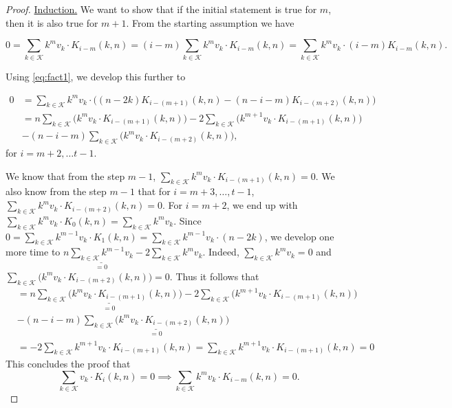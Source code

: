 \begin{proof}
    \underline{Induction.} We want to show that if the initial statement is true for $m$, then it is also true for $m+1$. From the starting assumption we have

    $$
    0 = \sum_{k \in \mathcal{K}} k^mv_k \cdot K_{i-m}(k, n) = (i-m)\sum_{k \in \mathcal{K}} k^mv_k \cdot K_{i-m}(k, n) = \sum_{k \in \mathcal{K}} k^mv_k \cdot (i-m)K_{i-m}(k, n).
    $$

    Using \cref{eq:fact1}, we develop this further to

    \begin{equation*}
    \begin{split}
        0 &= \sum_{k \in \mathcal{K}} k^mv_k \cdot \Big( (n - 2k)K_{i - (m+1)}(k, n) - (n - i - m)K_{i - (m + 2)}(k, n) \Big)\\
        & = n \sum_{k \in \mathcal{K}} \Big( k^mv_k \cdot K_{i - (m+1)}(k, n) \Big) - 2\sum_{k \in \mathcal{K}} \Big( k^{m+1}v_k \cdot K_{i - (m+1)}(k, n) \Big)\\& - (n - i - m)\sum_{k \in \mathcal{K}} \Big( k^mv_k \cdot K_{i - (m+2)}(k, n) \Big),
    \end{split}
    \end{equation*}
    for $i = m+2, \ldots t-1$.

    We know that from the step $m-1$, $\sum_{k \in \mathcal{K}} k^mv_k \cdot K_{i - (m+1)}(k, n) = 0$. We also know from the step $m-1$ that for $i = m+3, \ldots, t-1$, $\sum_{k \in \mathcal{K}} k^mv_k \cdot K_{i - (m+2)}(k, n) = 0$. For $i = m + 2$, we end up with $\sum_{k \in \mathcal{K}} k^mv_k \cdot K_0(k, n) = \sum_{k \in \mathcal{K}} k^mv_k$. Since $0 = \sum_{k \in \mathcal{K}} k^{m-1}v_k \cdot K_1(k, n) = \sum_{k \in \mathcal{K}} k^{m-1}v_k \cdot (n - 2k)$, we develop one more time to $n\underset{=0}{\underline{\sum_{k \in \mathcal{K}} k^{m-1}v_k}} - 2\sum_{k \in \mathcal{K}}k^mv_k$. Indeed, $\sum_{k \in \mathcal{K}}k^mv_k = 0$ and $\sum_{k \in \mathcal{K}} \Big( k^mv_k \cdot K_{i - (m+2)}(k, n) \Big) = 0$. Thus it follows that
    \begin{equation*}
    \begin{split}
        & = n \underset{=0}{\underline{\sum_{k \in \mathcal{K}} \Big( k^mv_k \cdot K_{i - (m+1)}(k, n) \Big)}} - 2\sum_{k \in \mathcal{K}} \Big( k^{m+1}v_k \cdot K_{i - (m+1)}(k, n) \Big)\\& - (n - i - m)\underset{=0}{\underline{\sum_{k \in \mathcal{K}} \Big( k^mv_k \cdot K_{i - (m+2)}(k, n) \Big)}}\\
        &= -2\sum_{k \in \mathcal{K}} k^{m+1}v_k \cdot K_{i - (m+1)}(k, n) = \sum_{k \in \mathcal{K}} k^{m+1}v_k \cdot K_{i - (m+1)}(k, n) = 0
    \end{split}
    \end{equation*}
    This concludes the proof that
    $$\sum_{k \in \mathcal{K}} v_k \cdot K_i(k, n) = 0 \implies \sum_{k \in \mathcal{K}} k^mv_k \cdot K_{i-m}(k, n) = 0.$$


\end{proof}

